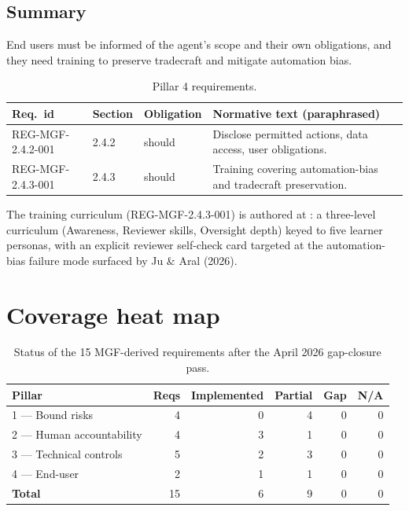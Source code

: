 \subsection*{Summary}

End users must be informed of the agent's scope and their own
obligations, and they need training to preserve tradecraft and mitigate
automation bias.

\begin{table}[h]
\centering
\small
\begin{tabularx}{\textwidth}{p{3.2cm}p{1.4cm}p{1.6cm}X}
\toprule
\textbf{Req.\ id} & \textbf{Section} & \textbf{Obligation} & \textbf{Normative text (paraphrased)} \\
\midrule
REG-MGF-2.4.2-001 & 2.4.2 & should & Disclose permitted actions, data access, user obligations. \\
REG-MGF-2.4.3-001 & 2.4.3 & should & Training covering automation-bias and tradecraft preservation. \\
\bottomrule
\end{tabularx}
\caption{Pillar 4 requirements.}
\label{tab:p4}
\end{table}

The training curriculum (REG-MGF-2.4.3-001) is authored at
: a three-level
curriculum (Awareness, Reviewer skills, Oversight depth) keyed to
five learner personas, with an explicit reviewer self-check card
targeted at the automation-bias failure mode surfaced by Ju \& Aral
(2026).

\section{Coverage heat map}

\begin{table}[h]
\centering
\small
\begin{tabularx}{\textwidth}{lrrrrr}
\toprule
\textbf{Pillar} & \textbf{Reqs} & \textbf{Implemented} & \textbf{Partial} & \textbf{Gap} & \textbf{N/A} \\
\midrule
1 --- Bound risks          & 4 & 0 & 4 & 0 & 0 \\
2 --- Human accountability & 4 & 3 & 1 & 0 & 0 \\
3 --- Technical controls   & 5 & 2 & 3 & 0 & 0 \\
4 --- End-user             & 2 & 1 & 1 & 0 & 0 \\
\midrule
\textbf{Total}             & 15 & 6 & 9 & 0 & 0 \\
\bottomrule
\end{tabularx}
\caption{Status of the 15 MGF-derived requirements after the
April 2026 gap-closure pass.}
\label{tab:mgf-coverage}
\end{table}

